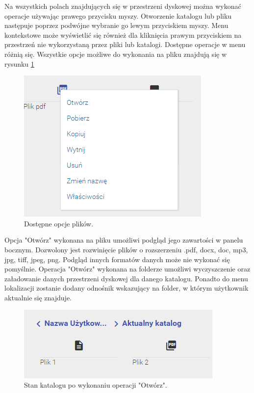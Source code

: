 Na wszystkich polach znajdujących się w przestrzeni dyskowej można wykonać operacje używając prawego przycisku myszy. Otworzenie katalogu lub pliku następuje poprzez podwójne wybranie go lewym przyciskiem myszy. Menu kontekstowe może wyświetlić się również dla kliknięcia prawym przyciskiem na przestrzeń nie wykorzystaną przez pliki lub katalogi. Dostępne operacje w menu różnią się. Wszystkie opcje możliwe do wykonania na pliku znajdują się w rysunku \ref{dostOpcje}
\begin{figure}[h!]
	\centering
	\includegraphics[width=0.7\linewidth]{"obrazy/6.3 opcjeplikow"}
	\caption{Dostępne opcje plików.}
	\label{dostOpcje}
\end{figure}

Opcja "Otwórz" wykonana na pliku umożliwi podgląd jego zawartości w panelu bocznym. Dozwolony jest rozwinięcie plików o rozszerzeniu .pdf, docx, doc, mp3, jpg, tiff, jpeg, png. Podgląd innych formatów danych może nie wykonać się pomyślnie.
Operacja "Otwórz" wykonana na folderze umożliwi wyczyszczenie oraz załadowanie danych przestrzeni dyskowej dla danego katalogu. Ponadto do menu lokalizacji zostanie dodany odnośnik wskazujący na folder, w którym użytkownik aktualnie się znajduje. 
\begin{figure}[h!]
	\centering
	\includegraphics[width=0.7\linewidth]{"obrazy/6.3 aktualny katalog"}
	\caption{Stan katalogu po wykonaniu operacji "Otwórz".}
	\label{openDirectory}
\end{figure}

